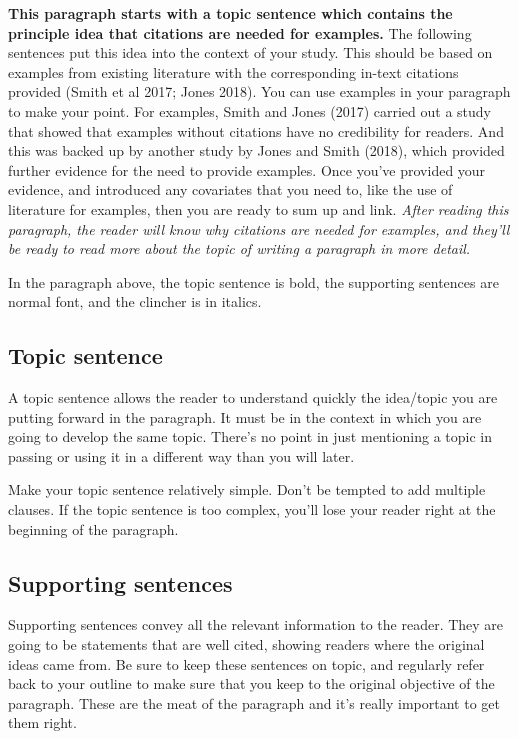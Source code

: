 \documentclass[
]{krantz}
\begin{document}
\textbf{This paragraph starts with a topic sentence which contains the principle idea that citations are needed for examples.} The following sentences put this idea into the context of your study. This should be based on examples from existing literature with the corresponding in-text citations provided (Smith et al 2017; Jones 2018). You can use examples in your paragraph to make your point. For examples, Smith and Jones (2017) carried out a study that showed that examples without citations have no credibility for readers. And this was backed up by another study by Jones and Smith (2018), which provided further evidence for the need to provide examples. Once you've provided your evidence, and introduced any covariates that you need to, like the use of literature for examples, then you are ready to sum up and link. \emph{After reading this paragraph, the reader will know why citations are needed for examples, and they'll be ready to read more about the topic of writing a paragraph in more detail.}

In the paragraph above, the topic sentence is bold, the supporting sentences are normal font, and the clincher is in italics.

\hypertarget{topic-sentence}{%
\subsection{Topic sentence}\label{topic-sentence}}

A topic sentence allows the reader to understand quickly the idea/topic you are putting forward in the paragraph. It must be in the context in which you are going to develop the same topic. There's no point in just mentioning a topic in passing or using it in a different way than you will later.

Make your topic sentence relatively simple. Don't be tempted to add multiple clauses. If the topic sentence is too complex, you'll lose your reader right at the beginning of the paragraph.

\hypertarget{supporting-sentences}{%
\subsection{Supporting sentences}\label{supporting-sentences}}

Supporting sentences convey all the relevant information to the reader. They are going to be statements that are well cited, showing readers where the original ideas came from. Be sure to keep these sentences on topic, and regularly refer back to your outline to make sure that you keep to the original objective of the paragraph. These are the meat of the paragraph and it's really important to get them right.
\end{document}
